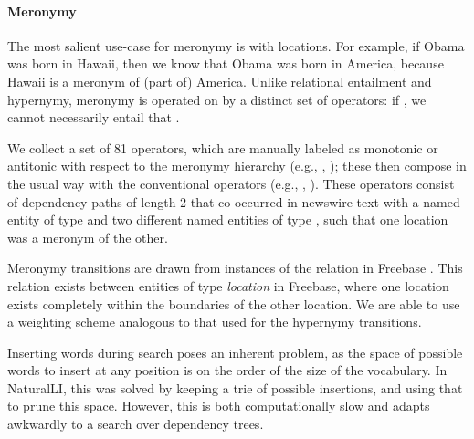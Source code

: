 \paragraph{Meronymy}
The most salient use-case for meronymy is with locations.
For example, if Obama was born in Hawaii, then we know that Obama was born in
  America, because Hawaii is a meronym of (part of) America.
Unlike relational entailment and hypernymy, meronymy is operated on by a
  distinct set of operators:
  if , we cannot necessarily entail that .


We collect a set of 81 operators, which are manually labeled as monotonic or antitonic with respect
  to the meronymy hierarchy (e.g., , ); 
  these then compose in the usual way with the conventional 
  operators (e.g., , ).
These operators consist of dependency paths of length 2 
that co-occurred in newswire text with a named entity of type 
 and two different named entities of type , 
such that one location was a meronym of the other.

Meronymy transitions are drawn from instances of the relation  in Freebase \cite{key:2008bollacker-freebase}.
This relation exists between entities of type \textit{location} in Freebase, where one location exists completely within the boundaries of the other location.
We are able to use a weighting scheme analogous to that used for the hypernymy transitions.


%
%
Inserting words during search poses an inherent problem, 
  as the space of possible words to insert at any
  position is on the order of the size of the vocabulary.
In NaturalLI, this was solved by keeping a trie of possible insertions, and
  using that to prune this space.
However, this is both computationally slow and adapts awkwardly to a search over
  dependency trees.

